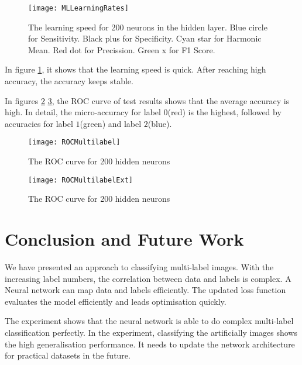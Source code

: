 \begin{figure}[htb]
\centering
\texttt{[image: MLLearningRates]}
\caption{\label{fig:MLLearningRates}The learning speed for 200 neurons in the hidden layer. Blue circle for Sensitivity. Black plus for Specificity. Cyan star for Harmonic Mean. Red dot for Precission. Green x for F1 Score.}
\end{figure}
In figure \ref{fig:MLLearningRates}, it shows that the learning speed is quick. After reaching high accuracy, the accuracy keeps stable. 

In figures \ref{fig:MLROCCurve} \ref{fig:MLROCCurveExt}, the ROC curve of test results shows that the average accuracy is high. In detail, the micro-accuracy for label $0$(red) is the highest, followed by accuracies for label $1$(green) and label $2$(blue). 
\begin{figure}[htb]
\centering
\texttt{[image: ROCMultilabel]}
\caption{\label{fig:MLROCCurve}The ROC curve for 200 hidden neurons}
\end{figure}

\begin{figure}[htb]
\centering
\texttt{[image: ROCMultilabelExt]}
\caption{\label{fig:MLROCCurveExt}The ROC curve for 200 hidden neurons}
\end{figure}

\section{Conclusion and Future Work}

We have presented an approach to classifying multi-label images. With the increasing label numbers, the correlation between data and labels is complex. A Neural network can map data and labels efficiently. The updated loss function evaluates the model efficiently and leads optimisation quickly. 

The experiment shows that the neural network is able to do complex multi-label classification perfectly. In the experiment, classifying the artificially images shows the high generalisation performance. It needs to update the network architecture for practical datasets in the future.












